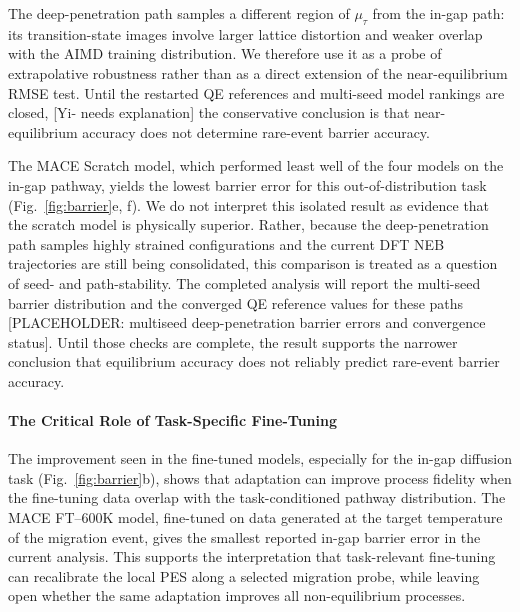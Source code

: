 \documentclass[pdflatex,sn-mathphys-num]{sn-jnl}%
\providecommand{\reviewermap}[3]{}
\theoremstyle{thmstyleone}%
\theoremstyle{thmstyletwo}%
\theoremstyle{thmstylethree}%
\begin{document}
The deep-penetration path samples a different region of $\mu_\tau$ from the in-gap path: its transition-state images involve larger lattice distortion and weaker overlap with the AIMD training distribution. We therefore use it as a probe of extrapolative robustness rather than as a direct extension of the near-equilibrium RMSE test. Until the restarted QE references and multi-seed model rankings are closed, [Yi- needs explanation] the conservative conclusion is that near-equilibrium accuracy does not determine rare-event barrier accuracy.

\reviewermap{REV-A3}{pending-cluster}{Deep-penetration interpretation requires multi-seed and restarted QE NEB confirmation before ranking models.}

The MACE Scratch model, which performed least well of the four models on the in-gap pathway, yields the lowest barrier error for this out-of-distribution task (Fig.~\ref{fig:barrier}e, f). We do not interpret this isolated result as evidence that the scratch model is physically superior. Rather, because the deep-penetration path samples highly strained configurations and the current DFT NEB trajectories are still being consolidated, this comparison is treated as a question of seed- and path-stability. The completed analysis will report the multi-seed barrier distribution and the converged QE reference values for these paths [PLACEHOLDER: multiseed deep-penetration barrier errors and convergence status]. Until those checks are complete, the result supports the narrower conclusion that equilibrium accuracy does not reliably predict rare-event barrier accuracy.

\paragraph{The Critical Role of Task-Specific Fine-Tuning}
\reviewermap{REV-A5}{pending-cluster}{Add Scratch-5\% random-initialization control trained on the same approximately 1000 configurations as FT-600K.}


The improvement seen in the fine-tuned models, especially for the in-gap diffusion task (Fig.~\ref{fig:barrier}b), shows that adaptation can improve process fidelity when the fine-tuning data overlap with the task-conditioned pathway distribution. The MACE FT--600K model, fine-tuned on data generated at the target temperature of the migration event, gives the smallest reported in-gap barrier error in the current analysis. This supports the interpretation that task-relevant fine-tuning can recalibrate the local PES along a selected migration probe, while leaving open whether the same adaptation improves all non-equilibrium processes.
\end{document}
